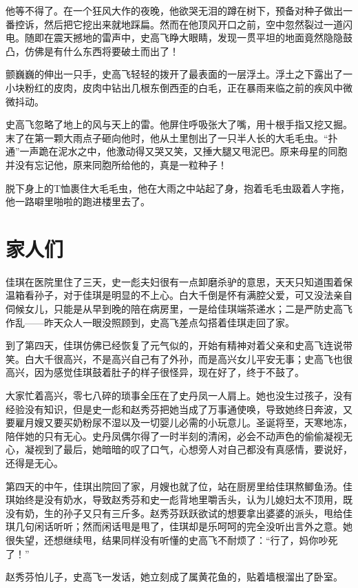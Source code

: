 他等不得了。在一个狂风大作的夜晚，他欲哭无泪的蹲在树下，预备对种子做出一番控诉，然后把它挖出来就地踩扁。然而在他顶风开口之前，空中忽然裂过一道闪电。随即在震天撼地的雷声中，史高飞睁大眼睛，发现一贯平坦的地面竟然隐隐鼓凸，仿佛是有什么东西将要破土而出了！

颤巍巍的伸出一只手，史高飞轻轻的拨开了最表面的一层浮土。浮土之下露出了一小块粉红的皮肉，皮肉中钻出几根东倒西歪的白毛，正在暴雨来临之前的疾风中微微抖动。

史高飞忽略了地上的风与天上的雷。他屏住呼吸张大了嘴，用十根手指又挖又掘。末了在第一颗大雨点子砸向他时，他从土里刨出了一只半人长的大毛毛虫。``扑通''一声跪在泥水之中，他激动得又哭又笑，又捶大腿又甩泥巴。原来母星的同胞并没有忘记他，原来同胞所给他的，真是一粒种子！

脱下身上的T恤裹住大毛毛虫，他在大雨之中站起了身，抱着毛毛虫趿着人字拖，他一路噼里啪啦的跑进楼里去了。

\chapter{家人们}

佳琪在医院里住了三天，史一彪夫妇很有一点卸磨杀驴的意思，天天只知道围着保温箱看孙子，对于佳琪是明显的不上心。白大千倒是怀有满腔父爱，可又没法亲自伺候女儿，只能是从早到晚的陪在病房里，一是给佳琪端茶递水；二是严防史高飞作乱——昨天众人一眼没照顾到，史高飞差点勾搭着佳琪走回了家。

到了第四天，佳琪仿佛已经恢复了元气似的，开始有精神对着父亲和史高飞连说带笑。白大千很高兴，不是高兴自己有了外孙，而是高兴女儿平安无事；史高飞也很高兴，因为感觉佳琪鼓着肚子的样子很怪异，现在好了，终于不鼓了。

大家忙着高兴，零七八碎的琐事全压在了史丹凤一人肩上。她也没生过孩子，没有经验没有知识，但是史一彪和赵秀芬把她当成了万事通使唤，导致她终日奔波，又要雇月嫂又要买奶粉尿不湿以及一切婴儿必需的小玩意儿。圣诞将至，天寒地冻，陪伴她的只有无心。史丹凤偶尔得了一时半刻的清闲，必会不动声色的偷偷凝视无心，凝视到了最后，她暗暗的叹了口气，心想旁人对自己都没有真感情，要说好，还得是无心。

第四天的中午，佳琪出院回了家，月嫂也就了位，站在厨房里给佳琪熬鲫鱼汤。佳琪始终是没有奶水，导致赵秀芬和史一彪背地里嚼舌头，认为儿媳妇太不顶用，既没有奶，生的孙子又只有三斤多。赵秀芬跃跃欲试的想要拿出婆婆的派头，甩给佳琪几句闲话听听；然而闲话甩是甩了，佳琪却是乐呵呵的完全没听出言外之意。她很失望，还想继续甩，结果同样没有听懂的史高飞不耐烦了：``行了，妈你吵死了！''

赵秀芬怕儿子，史高飞一发话，她立刻成了属黄花鱼的，贴着墙根溜出了卧室。

